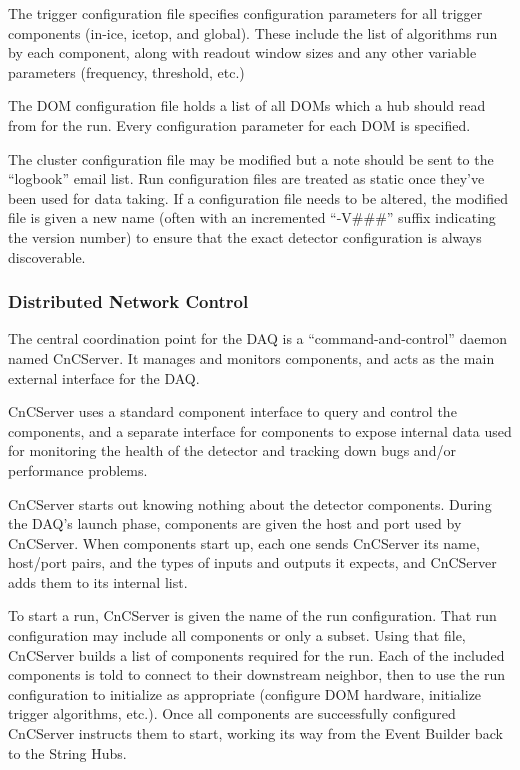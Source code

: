 The trigger configuration file specifies configuration parameters for all
trigger components (in-ice, icetop, and global).  These include the list of
algorithms run by each component, along with readout window sizes and any other
variable parameters (frequency, threshold, etc.)

The DOM configuration file holds a list of all DOMs which a hub should read from
for the run.  Every configuration parameter for each DOM is specified.

The cluster configuration file may be modified but a note should be sent to the
``logbook'' email list.  Run configuration files are treated as static once
they've been used for data taking.  If a configuration file needs to be
altered, the modified file is given a new name (often with an incremented
``-V\#\#\#'' suffix indicating the version number) to ensure that the exact
detector configuration is always discoverable.

\subsubsection{Distributed Network Control}

The central coordination point for the DAQ is a ``command-and-control'' daemon
named CnCServer.  It manages and monitors components, and acts as the main
external interface for the DAQ.

CnCServer uses a standard component interface to query and
control the components, and a separate interface for components to expose
internal data used for monitoring the health of the detector and tracking
down bugs and/or performance problems.

CnCServer starts out knowing nothing about the detector components.  During the
DAQ's launch phase, components are given the host and port used by CnCServer.
When components start up, each one sends CnCServer its name, host/port pairs,
and the types of inputs and outputs it expects, and CnCServer adds them to its
internal list.

To start a run, CnCServer is given the name of the run configuration.  That
run configuration may include all components or only a subset.  Using
that file, CnCServer builds a list of components required for the run.
Each of the included components is told to connect to their downstream
neighbor, then to use the run configuration to initialize as appropriate
(configure DOM hardware, initialize trigger algorithms, etc.).
Once all components are successfully
configured CnCServer instructs them to start, working its way from the Event
Builder back to the String Hubs.

